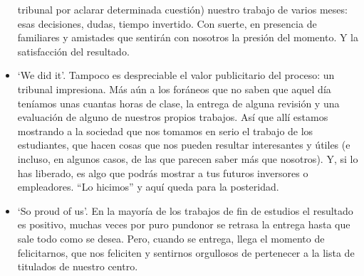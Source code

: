\begin{itemize}
  tribunal por aclarar determinada cuestión) nuestro trabajo de varios
  meses: esas decisiones, dudas, tiempo invertido. Con suerte, en
  presencia de familiares y amistades que sentirán con nosotros la
  presión del momento. Y la satisfacción del resultado. 
\item `We did it'. Tampoco es despreciable el valor publicitario del
  proceso: un tribunal impresiona. Más aún a los foráneos que no saben
  que aquel día teníamos unas cuantas horas de clase, la entrega de
  alguna revisión y una evaluación de alguno de nuestros propios
  trabajos. Así que allí estamos mostrando a la sociedad que nos
  tomamos en serio el trabajo de los estudiantes, que hacen cosas que
  nos pueden resultar interesantes y útiles (e incluso, en algunos
  casos, de las que parecen saber más que nosotros). Y, si lo has
  liberado, es algo que podrás mostrar a tus futuros inversores o
  empleadores. ``Lo hicimos'' y aquí queda para la posteridad. 
\item `So proud of us'. En la mayoría de los trabajos de fin de
  estudios el resultado es positivo, muchas veces por puro pundonor se
  retrasa la entrega hasta que sale todo como se desea. Pero, cuando
  se entrega, llega el momento de felicitarnos,
  que nos feliciten y sentirnos orgullosos de pertenecer a la lista de
  titulados de nuestro centro.
\end{itemize}

